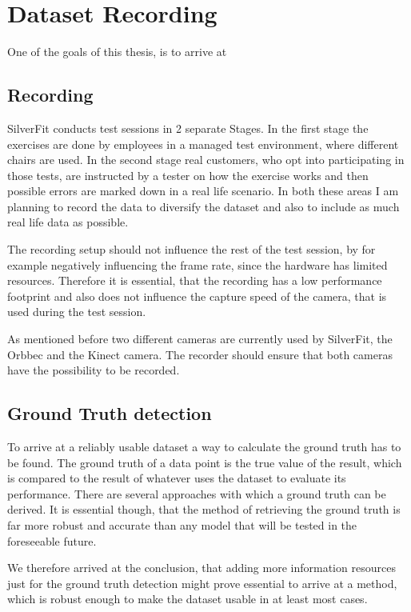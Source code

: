 \section{Dataset Recording}

One of the goals of this thesis, is to arrive at 

\subsection{Recording}

SilverFit conducts test sessions in 2 separate Stages. In the first stage the exercises are done by employees in a managed test environment, where different chairs are used. In the second stage real customers, who opt into participating in those tests, are instructed by a tester on how the exercise works and then possible errors are marked down in a real life scenario. In both these areas I am planning to record the data to diversify the dataset and also to include as much real life data as possible.

The recording setup should not influence the rest of the test session, by for example negatively influencing the frame rate, since the hardware has limited resources. Therefore it is essential, that the recording has a low performance footprint and also does not influence the capture speed of the camera, that is used during the test session.

As mentioned before two different cameras are currently used by SilverFit, the Orbbec and the Kinect camera. The recorder should ensure that both cameras have the possibility to be recorded. 

\subsection{Ground Truth detection}

To arrive at a reliably usable dataset a way to calculate the ground truth has to be found. The ground truth of a data point is the true value of the result, which is compared to the result of whatever uses the dataset to evaluate its performance. There are several approaches with which a ground truth can be derived. It is essential though, that the method of retrieving the ground truth is far more robust and accurate than any model that will be tested in the foreseeable future.

We therefore arrived at the conclusion, that adding more information resources just for the ground truth detection might prove essential to arrive at a method, which is robust enough to make the dataset usable in at least most cases.


